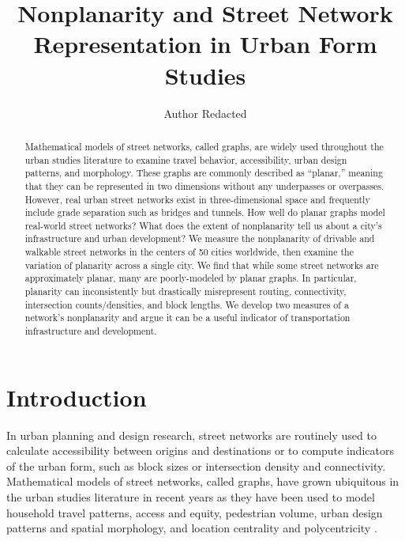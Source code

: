\documentclass[Afour,sageh,times]{sagej}
\begin{document}
\title{Nonplanarity and Street Network Representation in Urban Form Studies}
\author{Author Redacted }


\begin{abstract}

Mathematical models of street networks, called graphs, are widely used throughout the urban studies literature to examine travel behavior, accessibility, urban design patterns, and morphology. These graphs are commonly described as \enquote{planar,} meaning that they can be represented in two dimensions without any underpasses or overpasses. However, real urban street networks exist in three-dimensional space and frequently include grade separation such as bridges and tunnels. How well do planar graphs model real-world street networks? What does the extent of nonplanarity tell us about a city's infrastructure and urban development? We measure the nonplanarity of drivable and walkable street networks in the centers of 50 cities worldwide, then examine the variation of planarity across a single city. We find that while some street networks are approximately planar, many are poorly-modeled by planar graphs. In particular, planarity can inconsistently but drastically misrepresent routing, connectivity, intersection counts/densities, and block lengths. We develop two measures of a network's nonplanarity and argue it can be a useful indicator of transportation infrastructure and development.

\end{abstract}


\maketitle

\section{Introduction}

In urban planning and design research, street networks are routinely used to calculate accessibility between origins and destinations or to compute indicators of the urban form, such as block sizes or intersection density and connectivity. Mathematical models of street networks, called graphs, have grown ubiquitous in the urban studies literature in recent years as they have been used to model household travel patterns, access and equity, pedestrian volume, urban design patterns and spatial morphology, and location centrality and polycentricity \citep{marshall_street_2010,porta_alterations_2014,marshall_community_2014,hajrasouliha_impact_2015,parthasarathi_street_2015,knight_metrics_2015,gil_street_2016,zhong_revealing_2017}.
\end{document}
